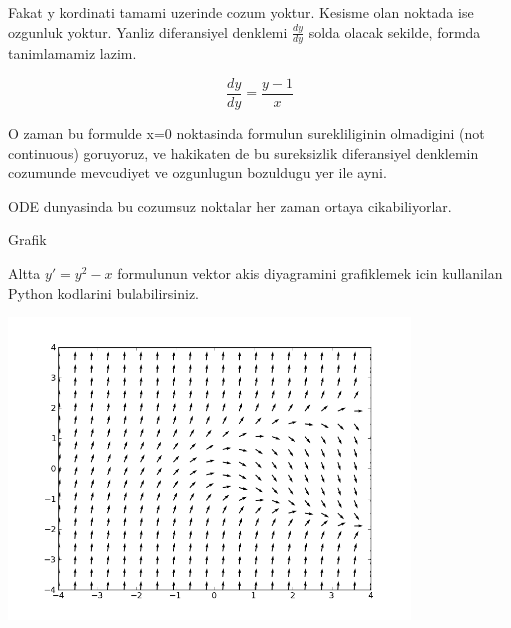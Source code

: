 \documentclass[12pt,fleqn]{article}
\begin{document}
Fakat y kordinati tamami uzerinde cozum yoktur. Kesisme olan noktada ise
ozgunluk yoktur. Yanliz diferansiyel denklemi $\frac{dy}{dy}$ solda olacak
sekilde, formda tanimlamamiz lazim. 

\[ \frac{dy}{dy} = \frac{y-1}{x} \]

O zaman bu formulde x=0 noktasinda formulun surekliliginin olmadigini (not
continuous) goruyoruz, ve hakikaten de bu sureksizlik diferansiyel denklemin
cozumunde mevcudiyet ve ozgunlugun bozuldugu yer ile ayni. 

ODE dunyasinda bu cozumsuz noktalar her zaman ortaya cikabiliyorlar. 

Grafik

Altta $y' = y^2-x$ formulunun vektor akis diyagramini grafiklemek icin
kullanilan Python kodlarini bulabilirsiniz.



\includegraphics[height=8cm]{isoclines.png}
\end{document}
